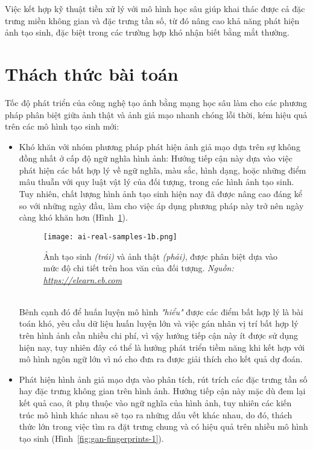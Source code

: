 Việc kết hợp kỹ thuật tiền xử lý với mô hình học sâu giúp khai thác được cả đặc trưng miền không gian và đặc trưng tần số, từ đó nâng cao khả năng phát hiện ảnh tạo sinh, đặc biệt trong các trường hợp khó nhận biết bằng mắt thường.

%
\section{Thách thức bài toán}

Tốc độ phát triển của công nghệ tạo ảnh bằng mạng học sâu làm cho các phương pháp phân biệt giữa ảnh thật và ảnh giả mạo nhanh chóng lỗi thời, kém hiệu quả trên các mô hình tạo sinh mới:

\begin{itemize}
	\item Khó khăn với nhóm phương pháp phát hiện ảnh giả mạo dựa trên sự không đồng nhất ở cấp độ ngữ nghĩa hình ảnh: Hướng tiếp cận này dựa vào việc phát hiện các bất hợp lý về ngữ nghĩa, màu sắc, hình dạng, hoặc những điểm mâu thuẫn với quy luật vật lý của đối tượng, trong các hình ảnh tạo sinh. Tuy nhiên, chất lượng hình ảnh tạo sinh hiện nay đã được nâng cao đáng kể so với những ngày đầu, làm cho việc áp dụng phương pháp này trở nên ngày càng khó khăn hơn (Hình~\ref{fig:ai-real-samples-1b}).
	\begin{figure}[htp]
		\centering
		\texttt{[image: ai-real-samples-1b.png]}
		\begin{minipage}{0.9\linewidth}
			\caption{Ảnh tạo sinh \textit{(trái)} và ảnh thật \textit{(phải)}, được phân biệt dựa vào mức độ chi tiết trên hoa văn của đối tượng. \textit{Nguồn: \url{https://elearn.eb.com}}}
			\label{fig:ai-real-samples-1b}
		\end{minipage}
	\end{figure}\\
	Bênh cạnh đó để huấn luyện mô hình \textit{"hiểu"} được các điểm bất hợp lý là bài toán khó, yêu cầu dữ liệu huấn luyện lớn và việc gán nhãn vị trí bất hợp lý trên hình ảnh cần nhiều chi phí, vì vậy hướng tiếp cận này ít được sử dụng hiện nay, tuy nhiên đây có thể là hướng phát triển tiềm năng khi kết hợp với mô hình ngôn ngữ lớn vì nó cho đưa ra được giải thích cho kết quả dự đoán.
	\item Phát hiện hình ảnh giả mạo dựa vào phân tích, rút trích các đặc trưng tần số hay đặc trưng không gian trên hình ảnh. Hướng tiếp cận này mặc dù đem lại kết quả cao, ít phụ thuộc vào ngữ nghĩa của hình ảnh, tuy nhiên các kiến trúc mô hình khác nhau sẽ tạo ra những dấu vết khác nhau, do đó, thách thức lớn trong việc tìm ra đặt trưng chung và có hiệu quả trên nhiều mô hình tạo sinh (Hình~\ref{fig:gan-fingerprints-1}).
	

\end{itemize}
